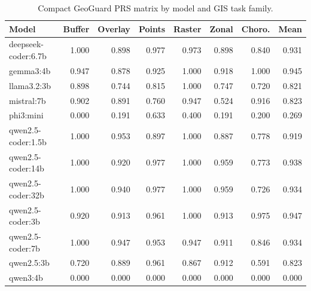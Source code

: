 \begin{table}[htbp]
\centering
\caption{Compact GeoGuard PRS matrix by model and GIS task family.}
\label{tab:geoguard-model-family-matrix}
\small
\setlength{\tabcolsep}{3pt}
\begin{tabular}{lrrrrrrr}
\toprule
Model & Buffer & Overlay & Points & Raster & Zonal & Choro. & Mean \\
\midrule
deepseek-coder:6.7b & 1.000 & 0.898 & 0.977 & 0.973 & 0.898 & 0.840 & 0.931 \\
gemma3:4b & 0.947 & 0.878 & 0.925 & 1.000 & 0.918 & 1.000 & 0.945 \\
llama3.2:3b & 0.898 & 0.744 & 0.815 & 1.000 & 0.747 & 0.720 & 0.821 \\
mistral:7b & 0.902 & 0.891 & 0.760 & 0.947 & 0.524 & 0.916 & 0.823 \\
phi3:mini & 0.000 & 0.191 & 0.633 & 0.400 & 0.191 & 0.200 & 0.269 \\
qwen2.5-coder:1.5b & 1.000 & 0.953 & 0.897 & 1.000 & 0.887 & 0.778 & 0.919 \\
qwen2.5-coder:14b & 1.000 & 0.920 & 0.977 & 1.000 & 0.959 & 0.773 & 0.938 \\
qwen2.5-coder:32b & 1.000 & 0.940 & 0.977 & 1.000 & 0.959 & 0.726 & 0.934 \\
qwen2.5-coder:3b & 0.920 & 0.913 & 0.961 & 1.000 & 0.913 & 0.975 & 0.947 \\
qwen2.5-coder:7b & 1.000 & 0.947 & 0.953 & 0.947 & 0.911 & 0.846 & 0.934 \\
qwen2.5:3b & 0.720 & 0.889 & 0.961 & 0.867 & 0.912 & 0.591 & 0.823 \\
qwen3:4b & 0.000 & 0.000 & 0.000 & 0.000 & 0.000 & 0.000 & 0.000 \\
\bottomrule
\end{tabular}
\end{table}
